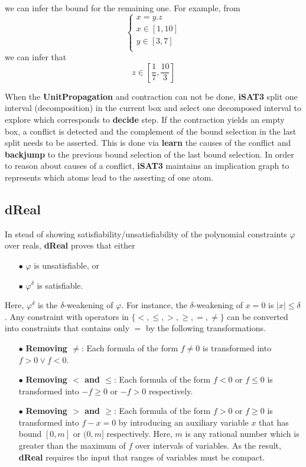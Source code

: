 \documentclass[runningheads,a4paper,oribibl]{llncs}
\begin{document}
{\begin{itemize}
we can infer the bound for the remaining one. For example, from
\[\left\{ 
  \begin{array}{l}
    x = y.z\\
    x \in [1, 10]\\
    y \in [3, 7]\\
   \end{array}
    \right.\]
we can infer that \[z \in [\frac{1}{7}, \frac{10}{3}] \]
\end{itemize}
When the \textbf{UnitPropagation} and contraction can not be done, \textbf{iSAT3} split one interval (decomposition) 
in the current box and select one decomposed interval to explore which corresponds to \textbf{decide} step. 
If the contraction yields an empty box, a conflict is detected and the complement of the bound selection 
in the last split needs to be asserted. This is done via \textbf{learn} the causes of the conflict and 
\textbf{backjump} to the previous bound selection of the last bound selection. In order to reason about causes of a conflict, 
\textbf{iSAT3} maintains an implication graph to represents which atoms lead to the asserting of one atom. 

\subsection*{dReal}
In stead of showing satisfiability/unsatisfiability of the polynomial constraints $\varphi$ over reals, 
\textbf{dReal} proves that either
\begin{itemize}
\item [$\bullet$] $\varphi$ is unsatisfiable, or 
\item [$\bullet$] $\varphi^\delta$ is satisfiable. 
\end{itemize}
Here, $\varphi^\delta$ is the $\delta$-weakening of $\varphi$. For instance, the $\delta$-weakening of $x = 0$ is 
$|x| \le \delta$. Any constraint with operators in $\{<, \le, > , \ge, =, \not=\}$ can be converted into constraints 
that contains only $=$ by the following transformations.
\begin{itemize}
\item [$\bullet$] \textbf{Removing $\not=$}: Each formula of the form $f \not= 0$ is transformed into $f > 0 \vee f < 0$.
\item [$\bullet$] \textbf{Removing $<$ and $\le$}: Each formula of the form $f < 0$ or $f \le 0$ is transformed into 
$-f \ge 0$ or $-f > 0$ respectively.
\item [$\bullet$] \textbf{Removing $>$ and $\ge$}: Each formula of the form $f > 0$ or $f \ge 0$ is transformed into 
$f - x = 0$ by introducing an auxiliary variable $x$ that has bound $[0, m]$ or $(0, m]$ respectively. 
Here, $m$ is any rational number which is greater than the maximum of $f$ over intervals of variables. 
As the result, \textbf{dReal} requires the input that ranges of variables must be compact.
\end{itemize}

}
\end{document}
